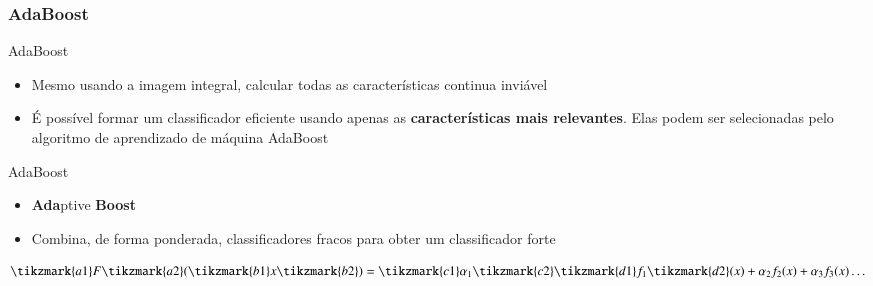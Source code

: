 \subsubsection{AdaBoost}

\begin{frame}{AdaBoost}
\begin{itemize}
    \item Mesmo usando a imagem integral, calcular todas as características continua inviável
    \item É possível formar um classificador eficiente usando apenas as \textbf{características mais relevantes}. Elas podem ser selecionadas pelo algoritmo de aprendizado de máquina AdaBoost
\end{itemize}
\end{frame}


\begin{frame}{AdaBoost}
\begin{itemize}
    \item \textbf{Ada}ptive \textbf{Boost}
    \item Combina, de forma ponderada, classificadores fracos para obter um classificador forte
\end{itemize}

\begin{equation*} \label{eq:adaboost}
    \tikzmark{a1}F\tikzmark{a2}(\tikzmark{b1}x\tikzmark{b2}) = \tikzmark{c1}\alpha_1\tikzmark{c2}\tikzmark{d1}f_1\tikzmark{d2}(x) + \alpha_2f_2(x) + \alpha_3f_3(x) \ldots
\end{equation*}


\end{frame}


